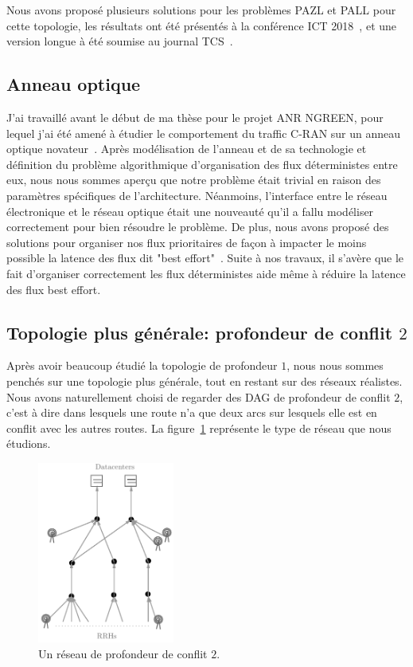 \documentclass{article}
\begin{document}
  Nous avons proposé plusieurs solutions pour les problèmes PAZL et PALL pour cette topologie, les résultats ont été présentés à la conférence ICT 2018~\cite{DBLP:conf/ict/BarthGLMS18}, et une version longue à été soumise au journal TCS~\cite{DBLP:journals/corr/abs-1902-03018}.
  \subsection{Anneau optique}
  J'ai travaillé avant le début de ma thèse pour le projet ANR NGREEN, pour lequel j'ai été amené à étudier le comportement du traffic C-RAN sur un anneau optique novateur~\cite{ngreenarchitecture,uscumlic2018scalable}.
  Après modélisation de l'anneau et de sa technologie et définition du problème algorithmique d'organisation des flux déterministes entre eux, nous nous sommes aperçu que notre problème était trivial en raison des paramètres spécifiques de l'architecture. Néanmoins, l'interface entre le réseau électronique et le réseau optique était une nouveauté qu'il a fallu modéliser correctement pour bien résoudre le problème. De plus, nous avons proposé des solutions pour organiser nos flux prioritaires de façon à impacter le moins possible la latence des flux dit "best effort"~\cite{DBLP:journals/corr/abs-1902-03018}. Suite à nos travaux, il s'avère que le fait d'organiser correctement les flux déterministes aide même à réduire la latence des flux best effort.

   \subsection{Topologie plus générale: profondeur de conflit $2$}
 
 Après avoir beaucoup étudié la topologie de profondeur $1$, nous nous sommes penchés sur une topologie plus générale, tout en restant sur des réseaux réalistes. Nous avons naturellement choisi de regarder des DAG de profondeur de conflit $2$, c'est à dire dans lesquels une route n'a que deux arcs sur lesquels elle est en conflit avec les autres routes.
 La figure~\ref{fig:extendendgraphgrey} représente le type de réseau que nous étudions. 

\begin{figure}[h]
\begin{center}
 \includegraphics[width=0.4\textwidth]{extendendgraphgrey}
\caption{Un réseau de profondeur de conflit $2$.}\label{fig:extendendgraphgrey}
\end{center}
\end{figure}
\end{document}

